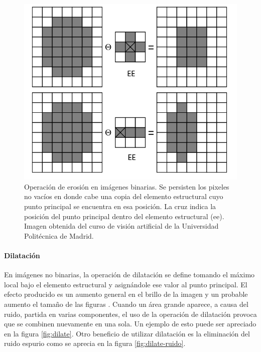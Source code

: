 \begin{figure}[tpb]
\begin{center}
  \includegraphics[scale=0.4]{vision/figures/erode-sample.png}
\end{center}
  \caption[Operaci\'on de erosi\'on]{\small Operaci\'on de erosi\'on en im\'agenes binarias. Se persisten los pixeles no vac\'ios en donde cabe una copia del elemento estructural cuyo punto principal se encuentra en esa posici\'on. La cruz indica la posici\'on del punto principal dentro del elemento estructural (ee). Imagen obtenida del curso de visi\'on artificial de la Universidad Polit\'ecnica de Madrid. } 
  \label{fig:erode-sample}
\end{figure}

	\paragraph{Dilataci\'on}
En im\'agenes no binarias, la operaci\'on de dilataci\'on se define 
tomando el m\'aximo local bajo el elemento estructural y asign\'andole ese valor al punto principal. El efecto producido es un aumento general en el brillo de la imagen y un probable aumento el tama\~no de las figuras \cite{nasa-dilate-erode}.  Cuando un \'area grande aparece, a causa del ruido, partida en varias componentes, el uso de la operaci\'on de dilataci\'on provoca que  se combinen nuevamente en una sola. Un ejemplo de esto puede ser apreciado en la figura \ref{fig:dilate}. Otro beneficio de utilizar dilataci\'on es la eliminaci\'on del ruido espurio como se aprecia en la figura \ref{fig:dilate-ruido}.

